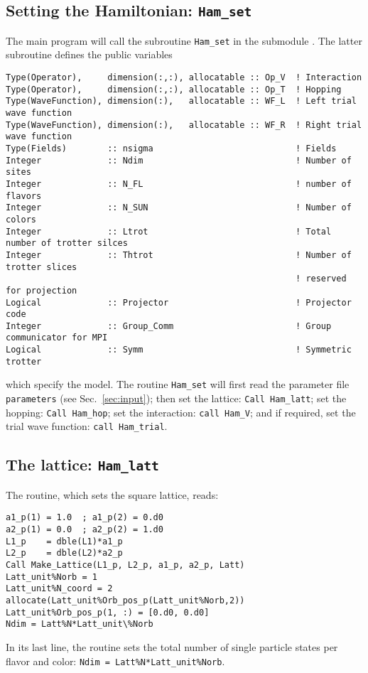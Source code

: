 \subsection{Setting the Hamiltonian:  \texttt{Ham\_set} }

The main program will call the subroutine \texttt{Ham\_set} in the submodule .
The latter  subroutine  defines the  public variables
\begin{lstlisting}[style=fortran]
Type(Operator),     dimension(:,:), allocatable :: Op_V  ! Interaction
Type(Operator),     dimension(:,:), allocatable :: Op_T  ! Hopping
Type(WaveFunction), dimension(:),   allocatable :: WF_L  ! Left trial wave function
Type(WaveFunction), dimension(:),   allocatable :: WF_R  ! Right trial wave function
Type(Fields)        :: nsigma                            ! Fields
Integer             :: Ndim                              ! Number of sites
Integer             :: N_FL                              ! number of flavors
Integer             :: N_SUN	                         ! Number of colors 
Integer             :: Ltrot                             ! Total number of trotter silces
Integer             :: Thtrot                            ! Number of trotter slices 
                                                         ! reserved for projection
Logical             :: Projector                         ! Projector code
Integer             :: Group_Comm                        ! Group communicator for MPI
Logical             :: Symm                              ! Symmetric trotter 
\end{lstlisting}
which specify the model.  The  routine \texttt{Ham\_set}  will first  read the parameter file \texttt{parameters} (see Sec.~\ref{sec:input}); then set the lattice: \texttt{Call Ham\_latt};  set the hopping: \texttt{Call Ham\_hop};  
 set the interaction: \texttt{call Ham\_V}; and if required, set the trial wave function: \texttt{call Ham\_trial}.

\subsection{The lattice: \texttt{Ham\_latt}} \label{U_PV_Ham_latt}

The routine, which sets the square lattice, reads:
\begin{lstlisting}[style=fortran]
a1_p(1) = 1.0  ; a1_p(2) = 0.d0
a2_p(1) = 0.0  ; a2_p(2) = 1.d0
L1_p    = dble(L1)*a1_p
L2_p    = dble(L2)*a2_p
Call Make_Lattice(L1_p, L2_p, a1_p, a2_p, Latt)
Latt_unit%Norb = 1
Latt_unit%N_coord = 2
allocate(Latt_unit%Orb_pos_p(Latt_unit%Norb,2))
Latt_unit%Orb_pos_p(1, :) = [0.d0, 0.d0]
Ndim = Latt%N*Latt_unit\%Norb

\end{lstlisting}
In its last line, the routine sets the total number of single particle states per flavor and color:
\texttt{Ndim = Latt\%N*Latt\_unit\%Norb}.

